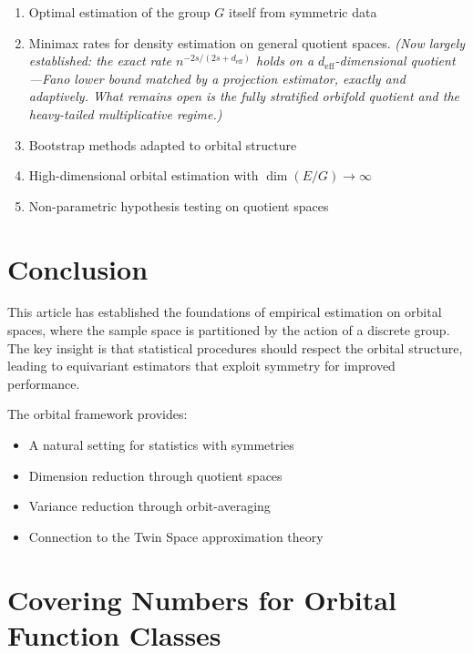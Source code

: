 \documentclass[11pt]{article}
\begin{document}
\begin{enumerate}
\item Optimal estimation of the group $G$ itself from symmetric data
\item Minimax rates for density estimation on general quotient spaces. \emph{(Now
largely established: the exact rate $n^{-2s/(2s+d_{\mathrm{eff}})}$ holds on a
$d_{\mathrm{eff}}$-dimensional quotient---Fano lower bound matched by a projection
estimator, exactly and adaptively. What remains open is the fully stratified
orbifold quotient and the heavy-tailed multiplicative regime.)}
\item Bootstrap methods adapted to orbital structure
\item High-dimensional orbital estimation with $\dim(E/G) \to \infty$
\item Non-parametric hypothesis testing on quotient spaces
\end{enumerate}

\section{Conclusion}
\label{sec:conclusion}

This article has established the foundations of empirical estimation on orbital spaces, where the sample space is partitioned by the action of a discrete group. The key insight is that statistical procedures should respect the orbital structure, leading to equivariant estimators that exploit symmetry for improved performance.

The orbital framework provides:
\begin{itemize}
\item A natural setting for statistics with symmetries
\item Dimension reduction through quotient spaces
\item Variance reduction through orbit-averaging
\item Connection to the Twin Space approximation theory
\end{itemize}


\appendix

\section{Covering Numbers for Orbital Function Classes}
\end{document}
